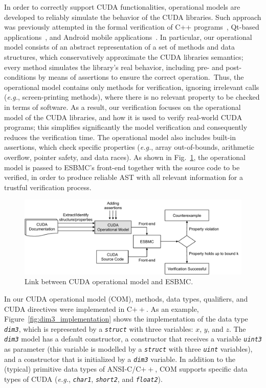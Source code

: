 \documentclass[times, doublespace]{cpeauth}
\begin{document}
In order to correctly support CUDA functionalities, operational models are developed to reliably simulate the behavior of the CUDA libraries. Such approach was previously attempted in the formal verification of C++ programs~\cite{ramalho:2013}, Qt-based applications~\cite{monteiro:2015,garcia:2016}, and Android mobile applications~\cite{android:2012,android:2015}. In particular, our operational model consists of an abstract representation of a set of methods and data structures, which conservatively approximate the CUDA libraries semantics; every method simulates the library's real behavior, including pre- and post-conditions by means of assertions to ensure the correct operation.\ Thus, the operational model contains only methods for verification, ignoring irrelevant calls ({\it e.g.}, screen-printing methods), where there is no relevant property to be checked in terms of software. As a result, our verification focuses on the operational model of the CUDA libraries, and how it is used to verify real-world CUDA programs; this simplifies significantly the model verification and consequently reduces the verification time. The operational model also includes built-in assertions, which check specific properties ({\it e.g.}, array out-of-bounds, arithmetic overflow, pointer safety, and data races). As shown in Fig.~\ref{figure:com}, the operational model is passed to ESBMC's front-end together with the source code to be verified, in order to produce reliable AST with all relevant information for a trustful verification process.

\begin{figure}[htb]
\centering
\includegraphics[width=120mm]{images/cuda-operational-model.pdf}
\caption{Link between CUDA operational model and ESBMC.}
\label{figure:com}
\end{figure}

In our CUDA operational model (COM), methods, data types, qualifiers, and CUDA directives were implemented in C$++$. As an example, Figure~\ref{fig:dim3_implementation} shows the implementation of the data type \emph{\tt dim3}, which is represented by a \emph{\tt struct} with three variables: $x$, $y$, and $z$. The \emph{\tt dim3} model has a default constructor, a constructor that receives a variable \emph{\tt uint3} as parameter (this variable is modelled by a \emph{\tt struct} with three \emph{\tt uint} variables), and a constructor that is initialized by a \emph{\tt dim3} variable. In addition to the (typical) primitive data types of ANSI-C/C$++$, COM supports specific data types of CUDA (\textit{e.g.}, \emph{\tt char1}, \emph{\tt short2}, and \emph{\tt float2}).
\end{document}
